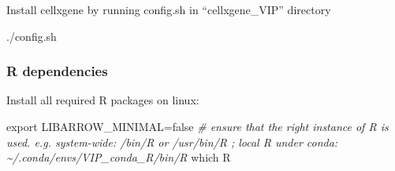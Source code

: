 \documentclass[
]{article}
\newenvironment{Shaded}{\begin{snugshade}}{\end{snugshade}}
\newcommand{\BuiltInTok}[1]{#1}
\newcommand{\CommentTok}[1]{\textcolor[rgb]{0.56,0.35,0.01}{\textit{#1}}}
\newcommand{\ExtensionTok}[1]{#1}
\newcommand{\FunctionTok}[1]{\textcolor[rgb]{0.00,0.00,0.00}{#1}}
\newcommand{\NormalTok}[1]{#1}
\newcommand{\VariableTok}[1]{\textcolor[rgb]{0.00,0.00,0.00}{#1}}
\begin{document}
Install cellxgene by running config.sh in ``cellxgene\_VIP'' directory

\begin{Shaded}
\begin{Highlighting}[]
\ExtensionTok{./config.sh}
\end{Highlighting}
\end{Shaded}

\hypertarget{r-dependencies}{%
\subsubsection{R dependencies}\label{r-dependencies}}

Install all required R packages on linux:

\begin{Shaded}
\begin{Highlighting}[]
\BuiltInTok{export} \VariableTok{LIBARROW\_MINIMAL=}\NormalTok{false}
\CommentTok{\#  ensure that the right instance of R is used. e.g. system{-}wide: /bin/R or /usr/bin/R ; local R under conda: \textasciitilde{}/.conda/envs/VIP\_conda\_R/bin/R}
\FunctionTok{which}\NormalTok{ R}


\end{Highlighting}
\end{Shaded}
\end{document}
